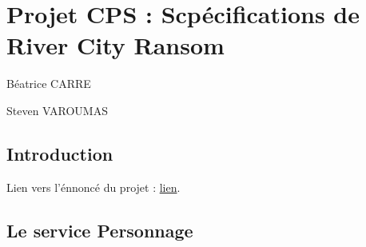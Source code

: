 \documentclass[a4paper, 11pt]{report}
\begin{document}
\chapter{Projet CPS : Scpécifications de River City Ransom}

Béatrice CARRE

Steven VAROUMAS

\section*{Introduction}
Lien vers l'énnoncé du projet : 
\href{http://www-master.ufr-info-p6.jussieu.fr/2013/spip.php?action=acceder_document&arg=2148&cle=11624d21d0734169986d403a88c3f6e4e1755b65&file=pdf\%2Fsujet_projet_2014.pdf}{lien}.

\section{Le service Personnage}
\end{document}
